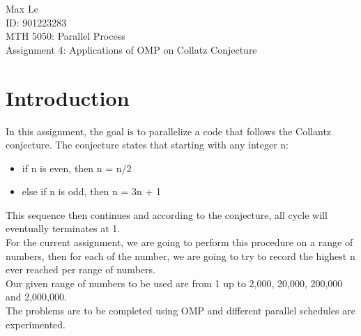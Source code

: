 \documentclass[12pt]{article}
\begin{document}
	\begin{flushleft}
		Max Le \\
		ID: 901223283\\
		MTH 5050: Parallel Process\\
        Assignment 4: Applications of OMP on Collatz Conjecture
    
	\end{flushleft}

        
        
        \section{Introduction}
            In this assignment, the goal is to parallelize a code that follows the Collantz conjecture. The conjecture states that starting with any integer n: 

            \begin{itemize}
                \item if n is even, then n = n/2
                \item else if n is odd, then n = 3n + 1 
            \end{itemize}
            
            This sequence then continues and according to the conjecture, all cycle will eventually terminates at 1. \\
            For the current assignment, we are going to perform this procedure on a range of numbers, then for each of the number, we are going to try to record the highest n ever reached per range of numbers. \\
            Our given range of numbers to be used are from 1 up to 2,000, 20,000, 200,000 and 2,000,000. \\
            The problems are to be completed using OMP and different parallel schedules are experimented.  
\end{document}

